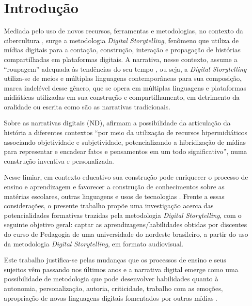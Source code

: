 \documentclass[portuguese]{textolivre}
\begin{document}
\begin{polyabstract}
\begin{english}
\begin{abstract}
\end{abstract}
\end{english}
\end{polyabstract}

\section{Introdução}
Mediada pelo uso de novos recursos, ferramentas e metodologias, no contexto da cibercultura \cite{levy2001cibercultura}, surge a metodologia \textit{Digital Storytelling}, fenômeno que utiliza de mídias digitais para a contação, construção, interação e propagação de histórias compartilhadas em plataformas digitais. A narrativa, nesse contexto, assume a “roupagem” adequada às tendências do seu tempo \cite[p.71]{busatto2005narrando}, ou seja, a \textit{Digital Storytelling} utiliza-se de meios e múltiplas linguagens contemporâneas para sua composição, marca indelével desse gênero, que se opera em múltiplas linguagens e plataformas midiáticas utilizadas em sua construção e compartilhamento, em detrimento da oralidade ou escrita como são as narrativas tradicionais.

Sobre as narrativas digitais (ND), \textcite[p.~54]{rodrigues2023para} afirmam a possibilidade da articulação da história a diferentes contextos “por meio da utilização de recursos hipermidiáticos associando objetividade e subjetividade, potencializando a hibridização de mídias para representar e encadear fatos e pensamentos em um todo significativo”, numa construção inventiva e personalizada.

Nesse limiar, em contexto educativo sua construção pode enriquecer o processo de ensino e aprendizagem e favorecer a construção de conhecimentos sobre as matérias escolares, outras linguagens e usos de tecnologias \cite{pasinato2023educacao}. Frente a essas considerações, o presente trabalho propõe uma investigação acerca das potencialidades formativas trazidas pela metodologia \textit{Digital Storytelling}, com o seguinte objetivo geral: captar as aprendizagens/habilidades obtidas por discentes do curso de Pedagogia de uma universidade do nordeste brasileiro, a partir do uso da metodologia \textit{Digital Storytelling}, em formato audiovisual.

Este trabalho justifica-se pelas mudanças que os processos de ensino e seus sujeitos vêm passando nos últimos anos e a narrativa digital emerge como uma possibilidade de metodologia que pode desenvolver habilidades quanto à autonomia, personalização, autoria, criticidade, trabalho com as emoções, apropriação de novas linguagens digitais fomentados por outras mídias \cite{rodrigues2023para}.
\end{document}
